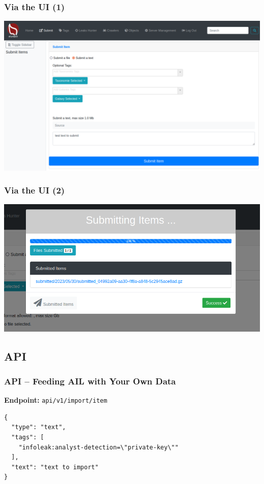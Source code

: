 \documentclass[10pt,aspectratio=169, colorlinks=true, linkcolor=circlBlue]{beamer}
\begin{document}
\begin{frame}
    \frametitle{Via the UI (1)}
    \centerline{\includegraphics[scale=0.20]{screenshot/ui_submit.png}}
\end{frame}

\begin{frame}
    \frametitle{Via the UI (2)}
    \centerline{\includegraphics[scale=0.29]{screenshot/ui_submit0.png}}
\end{frame}

\subsection{API}

\begin{frame}[fragile]
    \frametitle{API – Feeding AIL with Your Own Data}

    \textbf{Endpoint:} \texttt{api/v1/import/item}

    \vspace{0.5cm}

    \begin{tcolorbox}[colback=black!85, coltext=green, title=Example JSON Payload, fonttitle=\bfseries, arc=2mm, boxrule=0.4pt]
\begin{verbatim}
{
  "type": "text",
  "tags": [
    "infoleak:analyst-detection=\"private-key\""
  ],
  "text": "text to import"
}
\end{verbatim}
    \end{tcolorbox}

\end{frame}
\end{document}
